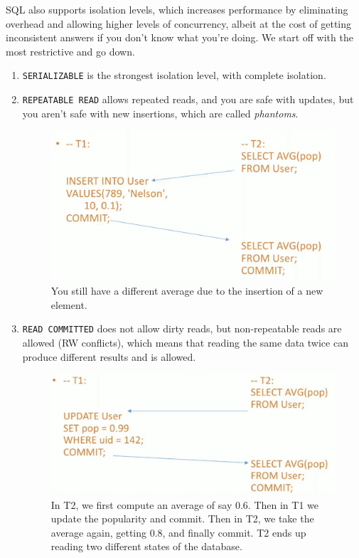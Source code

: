 \documentclass{article}
\begin{document}
    SQL also supports isolation levels, which increases performance by eliminating overhead and allowing higher levels of concurrency, albeit at the cost of getting inconsistent answers if you don't know what you're doing. We start off with the most restrictive and go down. 
    \begin{enumerate}
      \item \texttt{SERIALIZABLE} is the strongest isolation level, with complete isolation. 

      \item \texttt{REPEATABLE READ} allows repeated reads, and you are safe with updates, but you aren't safe with new insertions, which are called \textit{phantoms}. 

      \begin{figure}[H]
        \centering 
        \includegraphics[scale=0.4]{img/rep_read.png}
        \caption{You still have a different average due to the insertion of a new element. } 
        \label{fig:rep_read}
      \end{figure}

      \item \texttt{READ COMMITTED} does not allow dirty reads, but non-repeatable reads are allowed (RW conflicts), which means that reading the same data twice can produce different results and is allowed. 

      \begin{figure}[H]
        \centering 
        \includegraphics[scale=0.4]{img/read_c.png}
        \caption{In T2, we first compute an average of say 0.6. Then in T1 we update the popularity and commit. Then in T2, we take the average again, getting 0.8, and finally commit. T2 ends up reading two different states of the database.} 
        \label{fig:read_committed}
      \end{figure}


\end{enumerate}
\end{document}

